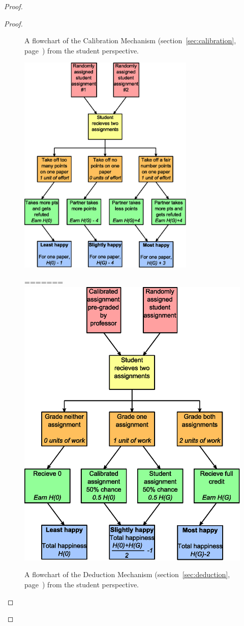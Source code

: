 \documentclass[12pt, Arial]{article}
\begin{document}
\begin{proof}
\begin{proof}
{\begin{figure}
		\caption {A flowchart of the Calibration Mechanism (section~\ref{sec:calibration}, page~\pageref{sec:calibration}) from the student perspective.\label{fig:calibration}}
\end{figure}
\begin{figure}
	\centering
		\includegraphics[width=0.75\textwidth]{Flowchart-Deduction.eps}
		\caption {A flowchart of the Deduction Mechanism (section~\ref{sec:deduction}, page~\pageref{sec:deduction}) from the student perspective.\label{fig:deduction}}
=======
		\includegraphics[width=\textwidth]{Flowchart-Calibration.eps}

\end{figure}}
\end{proof}
\end{proof}
\end{document}

